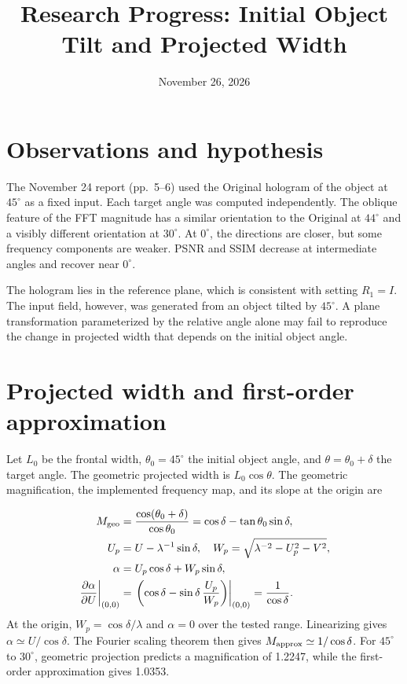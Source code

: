 \documentclass[a4paper,10pt]{article}
\title{Research Progress: Initial Object Tilt and Projected Width}
\author{}
\date{November 26, 2026}
\begin{document}
\maketitle
\section{Observations and hypothesis}
The November 24 report (pp.\ 5--6) used the Original hologram of the object at $45^\circ$ as a fixed input. Each target angle was computed independently. The oblique feature of the FFT magnitude has a similar orientation to the Original at $44^\circ$ and a visibly different orientation at $30^\circ$. At $0^\circ$, the directions are closer, but some frequency components are weaker. PSNR and SSIM decrease at intermediate angles and recover near $0^\circ$.

The hologram lies in the reference plane, which is consistent with setting $R_1=I$. The input field, however, was generated from an object tilted by $45^\circ$. A plane transformation parameterized by the relative angle alone may fail to reproduce the change in projected width that depends on the initial object angle.

\section{Projected width and first-order approximation}
Let $L_0$ be the frontal width, $\theta_0=45^\circ$ the initial object angle, and $\theta=\theta_0+\delta$ the target angle. The geometric projected width is $L_0\cos\theta$. The geometric magnification, the implemented frequency map, and its slope at the origin are

\begin{align}
M_{\rm geo} &= \frac{\cos(\theta_0+\delta)}{\cos\theta_0}
             =\cos\delta-\tan\theta_0\sin\delta,\\
U_p &= U-\lambda^{-1}\sin\delta,\quad
W_p=\sqrt{\lambda^{-2}-U_p^2-V^2},\\
\alpha &= U_p\cos\delta+W_p\sin\delta,\\
\left.\frac{\partial\alpha}{\partial U}\right|_{(0,0)}
 &=\left.\left(\cos\delta-\sin\delta\,\frac{U_p}{W_p}\right)\right|_{(0,0)}
 =\frac{1}{\cos\delta}.
\end{align}
At the origin, $W_p=\cos\delta/\lambda$ and $\alpha=0$ over the tested range. Linearizing gives $\alpha\simeq U/\cos\delta$. The Fourier scaling theorem then gives $M_{\rm approx}\simeq1/\cos\delta$. For $45^\circ$ to $30^\circ$, geometric projection predicts a magnification of 1.2247, while the first-order approximation gives 1.0353.
\end{document}

